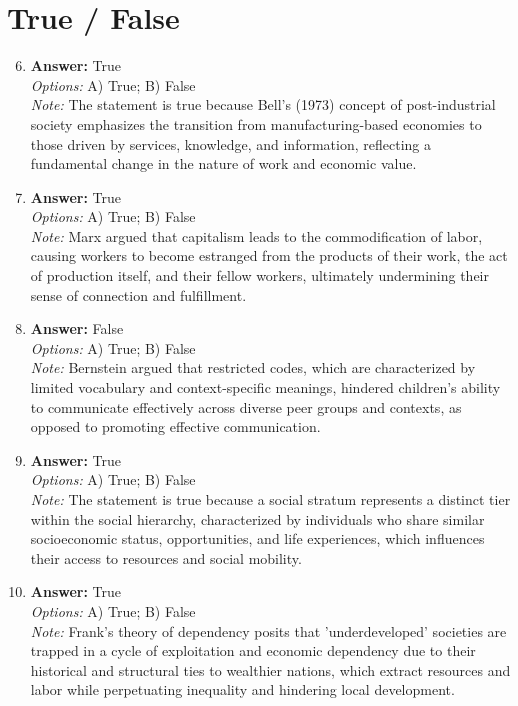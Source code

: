\documentclass[12pt]{article}
\begin{document}
\section*{True / False}
\begin{enumerate}[label=\arabic*.]
\setcounter{enumi}{5}
\item \textbf{Answer:} True
\\ \textit{Options:} A) True; B) False
\\ \textit{Note:} The statement is true because Bell's (1973) concept of post-industrial society emphasizes the transition from manufacturing-based economies to those driven by services, knowledge, and information, reflecting a fundamental change in the nature of work and economic value.
\item \textbf{Answer:} True
\\ \textit{Options:} A) True; B) False
\\ \textit{Note:} Marx argued that capitalism leads to the commodification of labor, causing workers to become estranged from the products of their work, the act of production itself, and their fellow workers, ultimately undermining their sense of connection and fulfillment.
\item \textbf{Answer:} False
\\ \textit{Options:} A) True; B) False
\\ \textit{Note:} Bernstein argued that restricted codes, which are characterized by limited vocabulary and context-specific meanings, hindered children's ability to communicate effectively across diverse peer groups and contexts, as opposed to promoting effective communication.
\item \textbf{Answer:} True
\\ \textit{Options:} A) True; B) False
\\ \textit{Note:} The statement is true because a social stratum represents a distinct tier within the social hierarchy, characterized by individuals who share similar socioeconomic status, opportunities, and life experiences, which influences their access to resources and social mobility.
\item \textbf{Answer:} True
\\ \textit{Options:} A) True; B) False
\\ \textit{Note:} Frank's theory of dependency posits that 'underdeveloped' societies are trapped in a cycle of exploitation and economic dependency due to their historical and structural ties to wealthier nations, which extract resources and labor while perpetuating inequality and hindering local development.
\end{enumerate}
\end{document}
